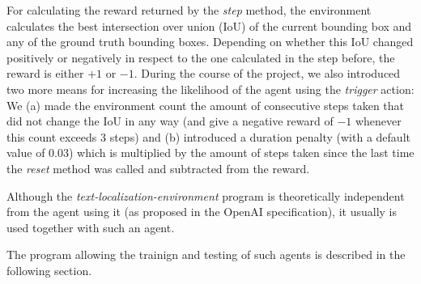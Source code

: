 For calculating the reward returned by the \textit{step} method, the environment calculates the best intersection over union (IoU) of the current bounding box and any of the ground truth bounding boxes. 
Depending on whether this IoU changed positively or negatively in respect to the one calculated in the step before, the reward is either $+1$ or $-1$. 
During the course of the project, we also introduced two more means for increasing the likelihood of the agent using the \textit{trigger} action: We (a) made the environment count the amount of consecutive steps taken that did not change the IoU in any way (and give a negative reward of $-1$ whenever this count exceeds 3 steps) and (b) introduced a duration penalty (with a default value of $0.03$) which is multiplied by the amount of steps taken since the last time the \textit{reset} method was called and subtracted from the reward.

Although the \textit{text-localization-environment} program is theoretically independent from the agent using it (as proposed in the OpenAI specification), it usually is used together with such an agent.

The program allowing the trainign and testing of such agents is described in the following section.
